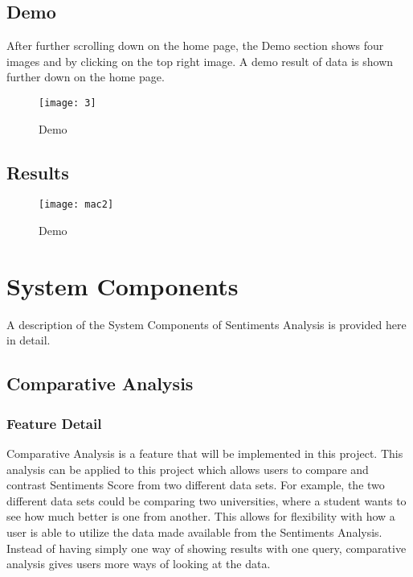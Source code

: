 \documentclass[12pt, titlepage]{article}
\begin{document}
\subsection{Demo}
After further scrolling down on the home page, the Demo section shows four images and by clicking on the top right image. A demo result of data is shown further down on the home page.
\begin{figure}[H]
\centering
\texttt{[image: 3]}
\caption{Demo}
\label{fig:Result}
\end{figure}

\subsection{Results}
\begin{figure}[H]
\centering
\texttt{[image: mac2]}
\caption{Demo}
\label{fig:Result}
\end{figure}


\newpage
\section{System Components}
A description of the System Components of Sentiments Analysis is provided here in detail. 

\subsection{Comparative Analysis}
\subsubsection{Feature Detail}
Comparative Analysis is a feature that will be implemented in this project. This analysis can be applied to this project which allows users to compare and contrast Sentiments Score from two different data sets. For example, the two different data sets could be comparing two universities, where a student wants to see how much better is one from another. This allows for flexibility with how a user is able to utilize the data made available from the Sentiments Analysis. Instead of having simply one way of showing results with one query, comparative analysis gives users more ways of looking at the data. \\
\end{document}
